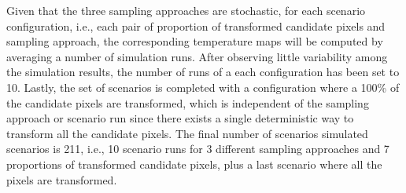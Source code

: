 \documentclass[10pt,letterpaper]{article}
\begin{document}
Given that the three sampling approaches are stochastic, for each scenario configuration, i.e., each pair of proportion of transformed candidate pixels and sampling approach, the corresponding temperature maps will be computed by averaging a number of simulation runs. 
After observing little variability among the simulation results, the number of runs of a each configuration has been set to 10.
Lastly, the set of scenarios is completed with a configuration where a 100\% of the candidate pixels are transformed, which is independent of the sampling approach or scenario run since there exists a single deterministic way to transform all the candidate pixels.
The final number of scenarios simulated scenarios is 211, i.e., 10 scenario runs for 3 different sampling approaches and 7 proportions of transformed candidate pixels, plus a last scenario where all the pixels are transformed.




  
\end{document}

